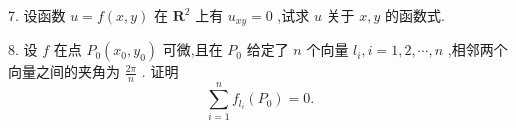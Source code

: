 7. 设函数 \(u = f\left( {x,y}\right)\) 在 \({\mathbf{R}}^{2}\) 上有 \({u}_{xy} = 0\) ,试求 \(u\) 关于 \(x,y\) 的函数式.

8. 设 \(f\) 在点 \({P}_{0}\left( {{x}_{0},{y}_{0}}\right)\) 可微,且在 \({P}_{0}\) 给定了 \(n\) 个向量 \({l}_{i},i = 1,2,\cdots ,n\) ,相邻两个向量之间的夹角为 \(\frac{2\pi }{n}\) . 证明
\[
\mathop{\sum }\limits_{{i = 1}}^{n}{f}_{{l}_{i}}\left( {P}_{0}\right)  = 0.
\]
